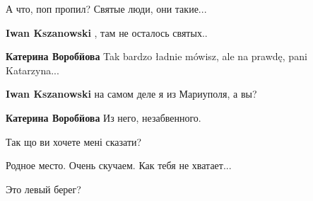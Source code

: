 
А что, поп пропил? Святые люди, они такие...

\begin{itemize} %
\textbf{Iwan Kszanowski} , там не осталось святых..

\textbf{Катерина Воробйова} Tak bardzo ładnie mówisz, ale na prawdę, pani Katarzyna...

\textbf{Iwan Kszanowski} на самом деле я из Мариуполя, а вы?

\textbf{Катерина Воробйова} Из него, незабвенного.

Так що ви хочете мені сказати?
\end{itemize} %


Родное место. Очень скучаем. Как тебя не хватает...


Это левый берег?

